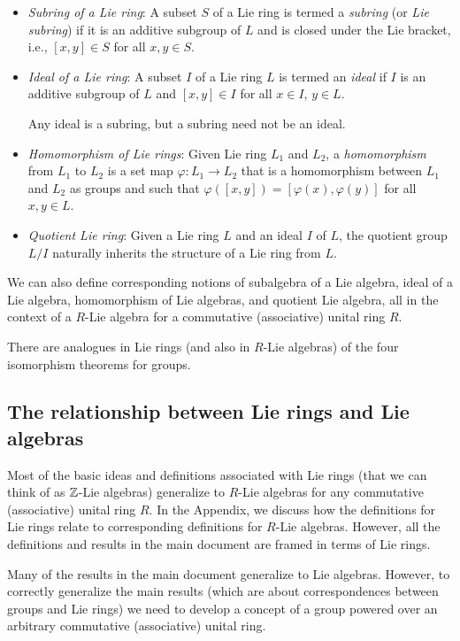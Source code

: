 \begin{itemize}
\item {\em Subring of a Lie ring}: A subset $S$ of a Lie ring is
  termed a {\em subring} (or {\em Lie subring}) if it is an additive
  subgroup of $L$ and is closed under the Lie bracket, i.e., $[x,y]
  \in S$ for all $x,y \in S$.
\item {\em Ideal of a Lie ring}: A subset $I$ of a Lie ring $L$ is
  termed an {\em ideal} if $I$ is an additive subgroup of $L$ and
  $[x,y] \in I$ for all $x \in I$, $y \in L$.

  Any ideal is a subring, but a subring need not be an ideal.
\item {\em Homomorphism of Lie rings}: Given Lie ring $L_1$ and $L_2$,
  a {\em homomorphism} from $L_1$ to $L_2$ is a set map $\varphi:L_1
  \to L_2$ that is a homomorphism between $L_1$ and $L_2$ as groups
  and such that $\varphi([x,y]) = [\varphi(x),\varphi(y)]$ for all $x,y \in L$.
\item {\em Quotient Lie ring}: Given a Lie ring $L$ and an ideal $I$
  of $L$, the quotient group $L/I$ naturally inherits the structure of
  a Lie ring from $L$.
\end{itemize}

We can also define corresponding notions of subalgebra of a Lie
algebra, ideal of a Lie algebra, homomorphism of Lie algebras, and
quotient Lie algebra, all in the context of a $R$-Lie algebra for a
commutative (associative) unital ring $R$.

There are analogues in Lie rings (and also in $R$-Lie algebras) of the
four isomorphism theorems for groups.

\subsection{The relationship between Lie rings and Lie algebras}

Most of the basic ideas and definitions associated with Lie rings
(that we can think of as $\mathbb{Z}$-Lie algebras) generalize to $R$-Lie
algebras for any commutative (associative) unital ring $R$. In the
Appendix, we discuss how the definitions for Lie rings relate to
corresponding definitions for $R$-Lie algebras. However, all the
definitions and results in the main document are framed in terms of
Lie rings. 

Many of the results in the main document generalize to Lie
algebras. However, to correctly generalize the main results (which are
about correspondences between groups and Lie rings) we need to develop
a concept of a group powered over an arbitrary commutative
(associative) unital ring. %

